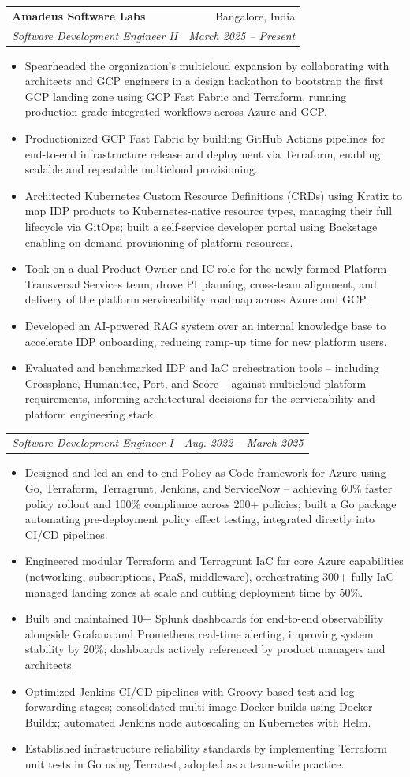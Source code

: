 \documentclass[letterpaper,11pt]{article}
\makeatletter
\newcommand{\resumeItem}[1]{
  \item\small{
    {#1 \vspace{-2pt}}
  }
}
\newcommand{\resumeSubheading}[4]{
  \vspace{-2pt}\item
    \begin{tabular*}{0.97\textwidth}[t]{l@{\extracolsep{\fill}}r}
      \textbf{#1} & #2 \\
      \textit{\small#3} & \textit{\small #4} \\
    \end{tabular*}\vspace{-7pt}
}
\newcommand{\resumeSubSubheading}[2]{
    \item
    \begin{tabular*}{0.97\textwidth}{l@{\extracolsep{\fill}}r}
      \textit{\small#1} & \textit{\small #2} \\
    \end{tabular*}\vspace{-7pt}
}
\newcommand{\resumeItemListStart}{\begin{itemize}}
\newcommand{\resumeItemListEnd}{\end{itemize}\vspace{-5pt}}
\makeatother
\begin{document}
    \resumeSubheading
      {Amadeus Software Labs}{Bangalore, India}
      {Software Development Engineer II}{March 2025 -- Present}
      \resumeItemListStart
        \resumeItem{Spearheaded the organization's multicloud expansion by collaborating with architects and GCP engineers in a design hackathon to bootstrap the first GCP landing zone using GCP Fast Fabric and Terraform, running production-grade integrated workflows across Azure and GCP.}
        \resumeItem{Productionized GCP Fast Fabric by building GitHub Actions pipelines for end-to-end infrastructure release and deployment via Terraform, enabling scalable and repeatable multicloud provisioning.}
        \resumeItem{Architected Kubernetes Custom Resource Definitions (CRDs) using Kratix to map IDP products to Kubernetes-native resource types, managing their full lifecycle via GitOps; built a self-service developer portal using Backstage enabling on-demand provisioning of platform resources.}
        \resumeItem{Took on a dual Product Owner and IC role for the newly formed Platform Transversal Services team; drove PI planning, cross-team alignment, and delivery of the platform serviceability roadmap across Azure and GCP.}
        \resumeItem{Developed an AI-powered RAG system over an internal knowledge base to accelerate IDP onboarding, reducing ramp-up time for new platform users.}
        \resumeItem{Evaluated and benchmarked IDP and IaC orchestration tools -- including Crossplane, Humanitec, Port, and Score -- against multicloud platform requirements, informing architectural decisions for the serviceability and platform engineering stack.}
      \resumeItemListEnd

    \resumeSubSubheading
      {Software Development Engineer I}{Aug. 2022 -- March 2025}
      \resumeItemListStart
        \resumeItem{Designed and led an end-to-end Policy as Code framework for Azure using Go, Terraform, Terragrunt, Jenkins, and ServiceNow -- achieving 60\% faster policy rollout and 100\% compliance across 200+ policies; built a Go package automating pre-deployment policy effect testing, integrated directly into CI/CD pipelines.}
        \resumeItem{Engineered modular Terraform and Terragrunt IaC for core Azure capabilities (networking, subscriptions, PaaS, middleware), orchestrating 300+ fully IaC-managed landing zones at scale and cutting deployment time by 50\%.}
        \resumeItem{Built and maintained 10+ Splunk dashboards for end-to-end observability alongside Grafana and Prometheus real-time alerting, improving system stability by 20\%; dashboards actively referenced by product managers and architects.}
        \resumeItem{Optimized Jenkins CI/CD pipelines with Groovy-based test and log-forwarding stages; consolidated multi-image Docker builds using Docker Buildx; automated Jenkins node autoscaling on Kubernetes with Helm.}
        \resumeItem{Established infrastructure reliability standards by implementing Terraform unit tests in Go using Terratest, adopted as a team-wide practice.}
      \resumeItemListEnd
\end{document}
